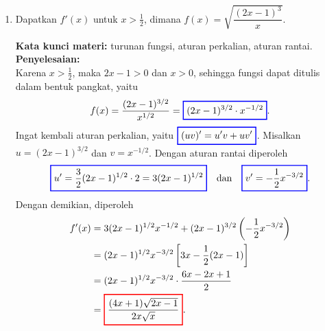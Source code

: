 \documentclass[10pt,openany,a4paper]{article}
\theoremstyle{definition}
\theoremstyle{definition}
\theoremstyle{plain}
\newenvironment{jawab}[2][tes]{%
\par\noindent\textbf{Kata kunci materi:} #1.\\
\textbf{Penyelesaian:} #2%
}{}
\begin{document}
\begin{enumerate}
    \item Dapatkan $f'(x)$ untuk $x>\frac{1}{2}$, dimana $f(x)=\sqrt{\dfrac{(2x-1)^3}{x}}$.
    \begin{jawab}[turunan fungsi, aturan perkalian, aturan rantai]{~\\
        Karena $x>\frac{1}{2}$, maka $2x-1>0$ dan $x>0$, sehingga fungsi dapat ditulis dalam bentuk pangkat, yaitu
        \begin{align*}
            f(x) = \frac{(2x-1)^{3/2}}{x^{1/2}} = \colorlet{oldcolor}{.}
        \color{blue}
        \setlength{\fboxrule}{1pt} \boxed{\color{oldcolor}(2x-1)^{3/2}\cdot x^{-1/2}}\color{oldcolor}.
        \end{align*}
        Ingat kembali aturan perkalian, yaitu $\colorlet{oldcolor}{.}
        \color{blue}
        \setlength{\fboxrule}{1pt} \boxed{\color{oldcolor}(uv)'=u'v+uv'}\color{oldcolor}$. Misalkan $u=(2x-1)^{3/2}$ dan $v=x^{-1/2}$. Dengan aturan rantai diperoleh
        \begin{align*}
            \colorlet{oldcolor}{.}
        \color{blue}
        \setlength{\fboxrule}{1pt} \boxed{\color{oldcolor}u' = \frac{3}{2}(2x-1)^{1/2}\cdot 2 = 3(2x-1)^{1/2}}\color{oldcolor} \quad\text{dan}\quad \colorlet{oldcolor}{.}
        \color{blue}
        \setlength{\fboxrule}{1pt} \boxed{\color{oldcolor}v' = -\frac{1}{2}x^{-3/2}}\color{oldcolor}.
        \end{align*}
        Dengan demikian, diperoleh
        \begin{align*}
            f'(x) &= 3(2x-1)^{1/2}x^{-1/2} + (2x-1)^{3/2}\left(-\frac{1}{2}x^{-3/2}\right)\\
            &= (2x-1)^{1/2}x^{-3/2}\left[3x - \frac{1}{2}(2x-1)\right]\\
            &= (2x-1)^{1/2}x^{-3/2}\cdot\frac{6x-2x+1}{2}\\
            &= \colorlet{oldcolor}{.}
        \color{red}
        \setlength{\fboxrule}{1pt} \boxed{\color{oldcolor}\frac{(4x+1)\sqrt{2x-1}}{2x\sqrt{x}}}\color{oldcolor}.
        \end{align*}
    }
    \end{jawab}
\end{enumerate}

\newpage
\end{document}
